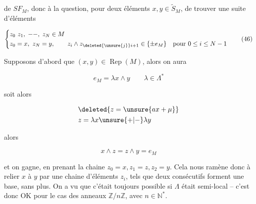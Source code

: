 

de $SF_M$, donc à la question, pour deux éléments $x,y\in\widetilde{S}_M$, de trouver une suite d'éléments

\[
\left\{\begin{aligned}
&z_0\ z_1,\;--,\;z_N\in M\\
&z_0=x,\ z_N=y,\qquad z_i\wedge z_{\deleted{\unsure{j}}i+1}\in\{\pm e_M\}\quad\text{pour }0\leq i\leq N-1
\end{aligned}\right.\tag*{(46)}
\]

Supposons d'abord que $(x,y)\in\operatorname{Rep}(M)$, alors on aura

\[
e_M=\lambda x\wedge y\qquad\lambda\in\Lambda^*
\]

soit alors

\[
\begin{aligned}
&\deleted{z=\unsure{ax+ \mu}}\\
&z=\lambda x\unsure{+|-}\lambda y
\end{aligned}
\]

alors

\[
x\wedge z=z\wedge y=e_M
\]

et on gagne, en prenant la chaine $z_0=x,z_1=z,z_2=y$. Cela nous ramène donc à relier $x$ à $y$ par une chaine d'éléments $z_i$, tels que deux consécutifs forment une base, sans plus. On a
 vu que c'était toujours possible si $\Lambda$ était semi-local -- c'est donc OK pour le cas des anneaux $\mathbb{Z}/n\mathbb{Z}$, avec $n\in\mathbb{N}^*$.  

